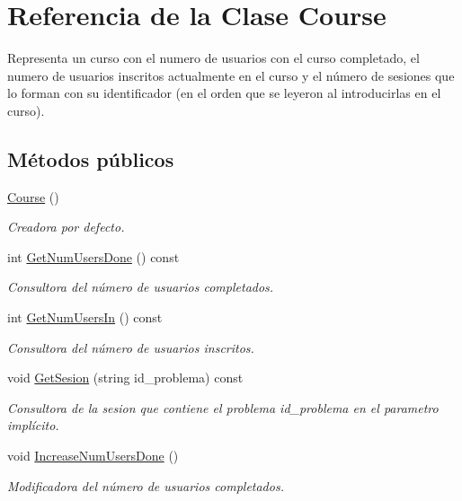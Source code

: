 \hypertarget{class_course}{}\section{Referencia de la Clase Course}
\label{class_course}


Representa un curso con el numero de usuarios con el curso completado, el numero de usuarios inscritos actualmente en el curso y el número de sesiones que lo forman con su identificador (en el orden que se leyeron al introducirlas en el curso).  


\subsection*{Métodos públicos}
\begin{DoxyCompactItemize}
\item 
\mbox{\hyperlink{class_course_a6b959ccf15d9ceed9e9c14a701561982}{Course}} ()
\begin{DoxyCompactList}\small\item\em Creadora por defecto. \end{DoxyCompactList}\item 
int \mbox{\hyperlink{class_course_ad17501c45b744c632235c05365f05f1d}{Get\+Num\+Users\+Done}} () const
\begin{DoxyCompactList}\small\item\em Consultora del número de usuarios completados. \end{DoxyCompactList}\item 
int \mbox{\hyperlink{class_course_a3ce2bc364698f6857385d7bb0ea82812}{Get\+Num\+Users\+In}} () const
\begin{DoxyCompactList}\small\item\em Consultora del número de usuarios inscritos. \end{DoxyCompactList}\item 
void \mbox{\hyperlink{class_course_a56a7f6bfd9dcd415c35246b2dc4afddb}{Get\+Sesion}} (string id\+\_\+problema) const
\begin{DoxyCompactList}\small\item\em Consultora de la sesion que contiene el problema id\+\_\+problema en el parametro implícito. \end{DoxyCompactList}\item 
void \mbox{\hyperlink{class_course_aa44f6ece5bc630400d9e7edff41680c0}{Increase\+Num\+Users\+Done}} ()
\begin{DoxyCompactList}\small\item\em Modificadora del número de usuarios completados. \end{DoxyCompactList}\item 

\end{DoxyCompactItemize}
